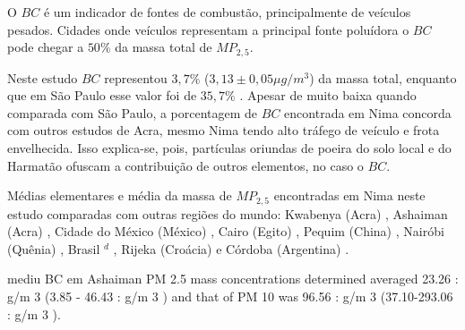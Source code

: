  



O $BC$ é um indicador de fontes de combustão, principalmente de veículos pesados.
Cidades onde veículos representam a principal fonte poluídora o $BC$ pode chegar 
a $50\%$ da massa total de $MP_{2,5}$.  

Neste estudo $BC$ representou $3,7 \%$ ($3,13\pm 0,05 \mu g / m^3$) da massa 
total, enquanto que em São Paulo esse valor foi de $35,7 \%$ \citep{andrade2012}.
Apesar de muito baixa quando comparada com São Paulo, a porcentagem de $BC$ 
encontrada em Nima concorda com outros estudos de Acra, mesmo Nima tendo alto
tráfego de veículo e frota envelhecida. Isso explica-se, pois, partículas 
oriundas de poeira do solo local e do Harmatão ofuscam a contribuição de outros
elementos, no caso o $BC$. 

\begin{landscape}
  \begin{table}[H]
    \centering
    
    \caption{Médias elementares e média da massa de $MP_{2,5}$ encontradas
             em Nima neste estudo comparadas com outras regiões do mundo:
             Kwabenya (Acra) \citep{aboh2009},
             Ashaiman (Acra) \citep{ofosu2012},
             Cidade do México (México) \citep{diaz2014},
             Cairo (Egito) \citep{boman2013},
             Pequim (China) \citep{yang2011},
             Nairóbi (Quênia)  \citep{gaita2014},
             Brasil $^d$ \citep{andrade2012urban},
             Rijeka (Croácia) \citep{ivovsevic2015} e
             Córdoba (Argentina) \citep{achad2014}.
             \label{table:fino_in_the_world}}
  \end{table} 
\end{landscape}

%    


\citet{dotse2012} mediu BC em Ashaiman
PM 2.5 mass concentrations determined averaged 23.26 : g/m 3 (3.85 - 46.43 : g/m 3 ) and that of PM 10 was 96.56
: g/m 3 (37.10-293.06 : g/m 3 ).

